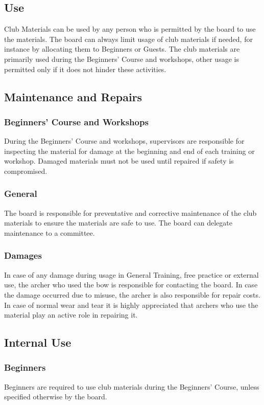 \documentclass[a4paper]{article}
\begin{document}
\subsection{Use}
{ Club Materials} can be used by any person who is permitted by the board to use the materials. The board can always limit usage of { club materials} if needed, for instance by allocating them to Beginners or Guests. The { club materials} are primarily used during the { Beginners' Course} and { workshops}, other usage is permitted only if it does not hinder these activities.

\subsection{Maintenance and Repairs}
\subsubsection{Beginners' Course and Workshops}
During the { Beginners' Course} and { workshops}, { supervisors} are responsible for inspecting the material for damage at the beginning and end of each training or { workshop}. Damaged materials must not be used until repaired if safety is compromised.

\subsubsection{General}
The board is responsible for preventative and corrective maintenance of the { club materials} to ensure the materials are safe to use. The board can delegate maintenance to a committee.

\subsubsection{Damages}
In case of any damage during usage in { General Training}, free practice or external use, the { archer} who used the bow is responsible for contacting the board. In case the damage occurred due to misuse, the { archer} is also responsible for repair costs. In case of normal wear and tear it is highly appreciated that { archers} who use the material play an active role in repairing it.

\subsection{Internal Use}
\subsubsection{Beginners}
{ Beginners} are required to use { club materials} during the Beginners' Course, unless specified otherwise by the board.
\end{document}
